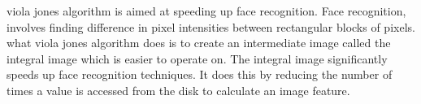 viola jones algorithm \cite{violajones} is aimed at speeding up face recognition. Face recognition, involves finding difference in
pixel intensities between rectangular blocks of pixels. what viola jones algorithm does is to create an intermediate image called
the integral image which is easier to operate on. The integral image significantly speeds up face recognition techniques. It does
this by reducing the number of times a value is accessed from the disk to calculate an image feature.
